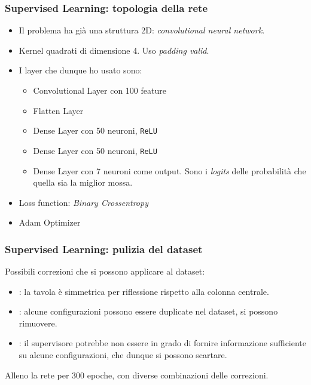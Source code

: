 \documentclass[handout]{beamer}
\begin{document}
  \begin{frame}
    \frametitle{Supervised Learning: topologia della rete}
    \begin{itemize}
      \item Il problema ha già una struttura 2D: \emph{convolutional neural network}.
      \item Kernel quadrati di dimensione 4. Uso \emph{padding valid}.
      \item I layer che dunque ho usato sono:
        \begin{itemize}
          \item Convolutional Layer con 100 feature
          \item Flatten Layer
          \item Dense Layer con 50 neuroni, \texttt{ReLU}
          \item Dense Layer con 50 neuroni, \texttt{ReLU}
          \item Dense Layer con 7 neuroni come output. Sono i \emph{logits} delle probabilità che quella sia la miglior mossa.
        \end{itemize}
      \item Loss function: \emph{Binary Crossentropy}
      \item Adam Optimizer
    \end{itemize}
  
  \end{frame}

  \begin{frame}
    \frametitle{Supervised Learning: pulizia del dataset}
    Possibili correzioni che si possono applicare al dataset:
    \begin{itemize}
      \item {}: la tavola è simmetrica per riflessione rispetto alla colonna centrale.
      \item {}: alcune configurazioni possono essere duplicate nel dataset, si possono rimuovere.
      \item {}: il supervisore potrebbe non essere in grado di fornire informazione sufficiente su alcune configurazioni, che dunque si possono scartare.
    \end{itemize}
    \pause
    \vspace{20pt}
    Alleno la rete per 300 epoche, con diverse combinazioni delle correzioni.
  \end{frame}
\end{document}
